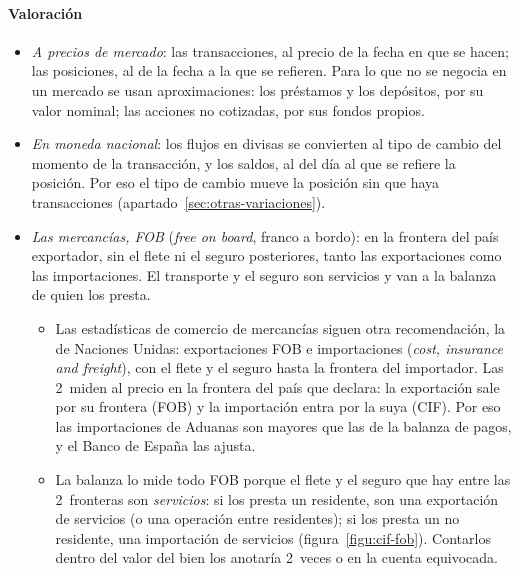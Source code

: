\documentclass[11pt]{article}
\begin{document}
\paragraph{Valoración}
\begin{itemize}
\item \emph{A precios de mercado}: las transacciones, al precio de la fecha en que se hacen; las posiciones, al de la fecha a la que se refieren. Para lo que no se negocia en un mercado se usan aproximaciones: los préstamos y los depósitos, por su valor nominal; las acciones no cotizadas, por sus fondos propios.
\item \emph{En moneda nacional}: los flujos en divisas se convierten al tipo de cambio del momento de la transacción, y los saldos, al del día al que se refiere la posición. Por eso el tipo de cambio mueve la posición sin que haya transacciones (apartado~\ref{sec:otras-variaciones}).
\item \emph{Las mercancías, FOB} (\emph{free on board}, franco a bordo): en la frontera del país exportador, sin el flete ni el seguro posteriores, tanto las exportaciones como las importaciones. El transporte y el seguro son servicios y van a la balanza de quien los presta.
  \begin{itemize}
  \item Las estadísticas de comercio de mercancías siguen otra recomendación, la de Naciones Unidas: exportaciones FOB e importaciones  (\emph{cost, insurance and freight}), con el flete y el seguro hasta la frontera del importador\nocite{ONU2011IMTS}. Las 2~miden al precio en la frontera del país que declara: la exportación sale por su frontera (FOB) y la importación entra por la suya (CIF). Por eso las importaciones de Aduanas son mayores que las de la balanza de pagos, y el Banco de España las ajusta\nocite{BdE2025NotaMet}.
  \item La balanza lo mide todo FOB porque el flete y el seguro que hay entre las 2~fronteras son \emph{servicios}: si los presta un residente, son una exportación de servicios (o una operación entre residentes); si los presta un no residente, una importación de servicios (figura~\ref{figu:cif-fob}). Contarlos dentro del valor del bien los anotaría 2~veces o en la cuenta equivocada.
  \end{itemize}
\end{itemize}

\begin{infografia}[H]
\centering
\caption{CIF y FOB: dónde se valora la mercancía y dónde van el flete y el seguro}\label{figu:cif-fob}
\end{infografia}
\end{document}
